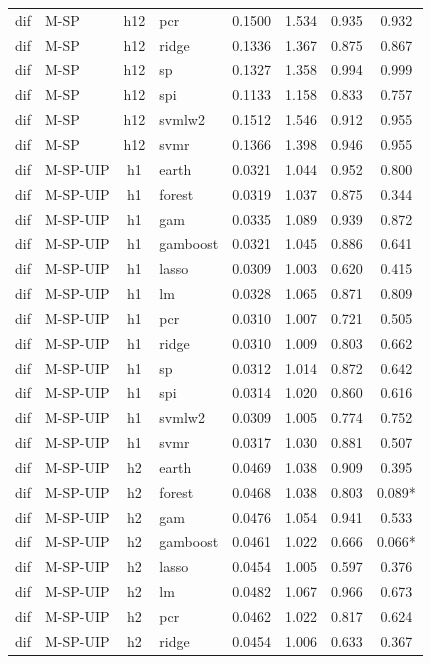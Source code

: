 \begin{ThreePartTable}
\begin{longtable}[t]{llclcccc}
dif & M-SP & h12 & pcr & 0.1500 & 1.534 & 0.935 & 0.932\\
dif & M-SP & h12 & ridge & 0.1336 & 1.367 & 0.875 & 0.867\\
dif & M-SP & h12 & sp & 0.1327 & 1.358 & 0.994 & 0.999\\
dif & M-SP & h12 & spi & 0.1133 & 1.158 & 0.833 & 0.757\\
dif & M-SP & h12 & svmlw2 & 0.1512 & 1.546 & 0.912 & 0.955\\
dif & M-SP & h12 & svmr & 0.1366 & 1.398 & 0.946 & 0.955\\
\addlinespace
dif & M-SP-UIP & h1 & earth & 0.0321 & 1.044 & 0.952 & 0.800\\
dif & M-SP-UIP & h1 & forest & 0.0319 & 1.037 & 0.875 & 0.344\\
dif & M-SP-UIP & h1 & gam & 0.0335 & 1.089 & 0.939 & 0.872\\
dif & M-SP-UIP & h1 & gamboost & 0.0321 & 1.045 & 0.886 & 0.641\\
dif & M-SP-UIP & h1 & lasso & 0.0309 & 1.003 & 0.620 & 0.415\\
dif & M-SP-UIP & h1 & lm & 0.0328 & 1.065 & 0.871 & 0.809\\
dif & M-SP-UIP & h1 & pcr & 0.0310 & 1.007 & 0.721 & 0.505\\
dif & M-SP-UIP & h1 & ridge & 0.0310 & 1.009 & 0.803 & 0.662\\
dif & M-SP-UIP & h1 & sp & 0.0312 & 1.014 & 0.872 & 0.642\\
dif & M-SP-UIP & h1 & spi & 0.0314 & 1.020 & 0.860 & 0.616\\
dif & M-SP-UIP & h1 & svmlw2 & 0.0309 & 1.005 & 0.774 & 0.752\\
dif & M-SP-UIP & h1 & svmr & 0.0317 & 1.030 & 0.881 & 0.507\\
\addlinespace
dif & M-SP-UIP & h2 & earth & 0.0469 & 1.038 & 0.909 & 0.395\\
dif & M-SP-UIP & h2 & forest & 0.0468 & 1.038 & 0.803 & 0.089*\\
dif & M-SP-UIP & h2 & gam & 0.0476 & 1.054 & 0.941 & 0.533\\
dif & M-SP-UIP & h2 & gamboost & 0.0461 & 1.022 & 0.666 & 0.066*\\
dif & M-SP-UIP & h2 & lasso & 0.0454 & 1.005 & 0.597 & 0.376\\
dif & M-SP-UIP & h2 & lm & 0.0482 & 1.067 & 0.966 & 0.673\\
dif & M-SP-UIP & h2 & pcr & 0.0462 & 1.022 & 0.817 & 0.624\\
dif & M-SP-UIP & h2 & ridge & 0.0454 & 1.006 & 0.633 & 0.367\\

\end{longtable}
\end{ThreePartTable}
